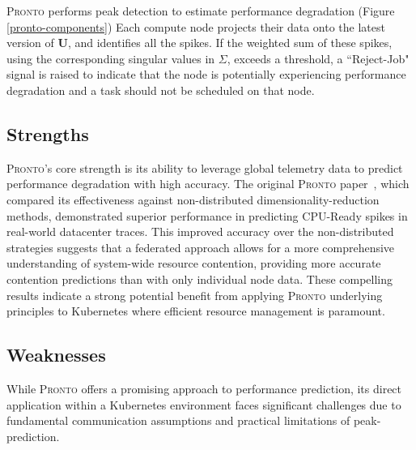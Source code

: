 \textsc{Pronto} performs peak detection to estimate performance degradation
(Figure \ref{pronto-components}) Each compute node projects their data onto the
latest version of $\textbf{U}$, and identifies all the spikes. If the weighted
sum of these spikes, using the corresponding singular values in $\Sigma$,
exceeds a threshold, a ``Reject-Job" signal is raised to indicate that the node
is potentially experiencing performance degradation and a task should not be
scheduled on that node.

\subsection{Strengths}
\textsc{Pronto}'s core strength is its ability to leverage global telemetry data
to predict performance degradation with high accuracy. The original
\textsc{Pronto} paper~\cite{grammenos_pronto_2021}, which compared its
effectiveness against non-distributed dimensionality-reduction methods,
demonstrated superior performance in predicting CPU-Ready spikes in real-world
datacenter traces. This improved accuracy over the non-distributed
strategies suggests that a federated approach allows for a more comprehensive
understanding of system-wide resource contention, providing more accurate
contention predictions than with only individual node data. These compelling
results indicate a strong potential benefit from applying \textsc{Pronto}
underlying principles to Kubernetes where efficient resource management is
paramount.

\subsection{Weaknesses}
\label{sec:intro-weakness}
While \textsc{Pronto} offers a promising approach to performance prediction, its
direct application within a Kubernetes environment faces significant challenges
due to fundamental communication assumptions and practical limitations of
peak-prediction.

